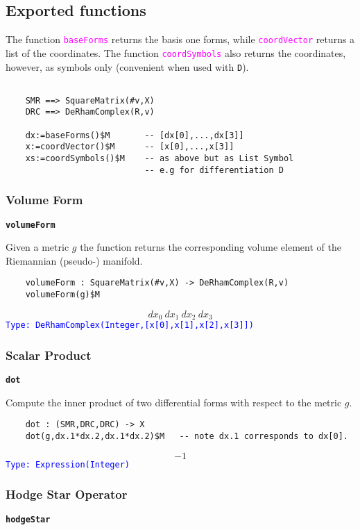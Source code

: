 \documentclass[12pt,a4paper]{article}
\newcommand{\spadfun}[1]{\textcolor{magenta}{\tt #1}}
\newcommand{\spadbold}[1]{{\tt\bf #1}}
\newcommand{\type}[1]{\textcolor{blue}{\tt\tiny #1}}
\begin{document}
\subsection{Exported functions}
The function \spadfun{baseForms} returns the basis one forms, while 
\spadfun{coordVector} returns a list of the coordinates. The function 
\spadfun{coordSymbols} also returns the coordinates, however, as symbols 
only (convenient when used with {\tt D}).
%
\begin{lstlisting} 
    
    SMR ==> SquareMatrix(#v,X)
    DRC ==> DeRhamComplex(R,v)

    dx:=baseForms()$M       -- [dx[0],...,dx[3]]
    x:=coordVector()$M      -- [x[0],...,x[3]]
    xs:=coordSymbols()$M    -- as above but as List Symbol 
                            -- e.g for differentiation D

\end{lstlisting} 
%
\subsubsection{Volume Form }
\spadbold{volumeForm}
  
Given a metric $g$ the function returns the corresponding volume 
element of the Riemannian (pseudo-) manifold.   

\begin{lstlisting}    
    volumeForm : SquareMatrix(#v,X) -> DeRhamComplex(R,v)    
    volumeForm(g)$M
\end{lstlisting}
\begin{displaymath}
	 {dx _ {0}} \  {dx _ {1}} \  {dx _ {2}} \  {dx _ {3}}	 
\end{displaymath}
\type{Type: DeRhamComplex(Integer,[x[0],x[1],x[2],x[3]])}
%
\subsubsection{Scalar Product} 
\spadbold{dot}

Compute the inner product of two differential forms with respect to the
metric $g$.
\begin{lstlisting}
    dot : (SMR,DRC,DRC) -> X    
    dot(g,dx.1*dx.2,dx.1*dx.2)$M   -- note dx.1 corresponds to dx[0].
\end{lstlisting}    
\begin{displaymath}
	-1
\end{displaymath}
\type{Type: Expression(Integer)}
%
\subsubsection{Hodge Star Operator}
\spadbold{hodgeStar}
\end{document}
